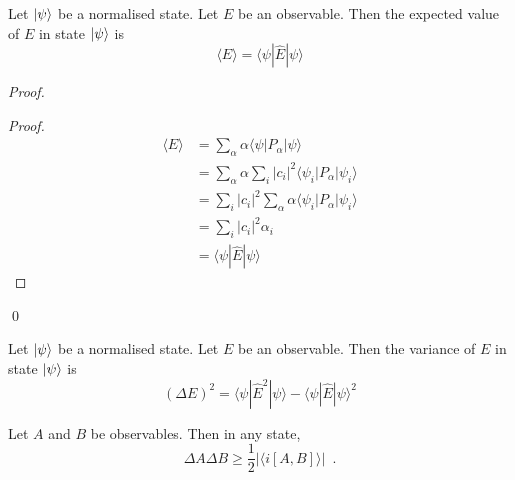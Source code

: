 \begin{prop}
Let $\left| {\psi} \right\rangle$ be a normalised state. Let $E$ be an observable. Then the expected value of $E$ in state $\left| {\psi} \right\rangle$ is
\[ \langle E \rangle = \langle \psi | \hat{E} | \psi \rangle \]
\end{prop}

\begin{proof}
\pf
{}
\begin{proof}
\pf
\begin{align*}
\langle E \rangle & = \sum_\alpha \alpha \langle \psi | P_\alpha | \psi \rangle \\
& = \sum_\alpha \alpha \sum_i |c_i|^2 \langle \psi_i | P_\alpha | \psi_i \rangle \\
& = \sum_i |c_i|^2 \sum_\alpha \alpha \langle \psi_i | P_\alpha | \psi_i \rangle \\
& = \sum_i |c_i|^2 \alpha_i \\
& = \langle \psi | \hat{E} | \psi \rangle
\end{align*}
\end{proof}
\qed
\end{proof}

\begin{cor}
Let $\left| {\psi} \right\rangle$ be a normalised state. Let $E$ be an observable. Then the variance of $E$ in state $\left| {\psi} \right\rangle$ is \[ (\Delta E)^2 = \langle \psi | \hat{E}^2 | \psi \rangle - \langle \psi | \hat{E} | \psi \rangle^2 \]
\end{cor}

\begin{thm}
Let $A$ and $B$ be observables. Then in any state,
\[ \Delta A \Delta B \geq \frac{1}{2} |\langle i [A,B] \rangle| \enspace . \]
\end{thm}

